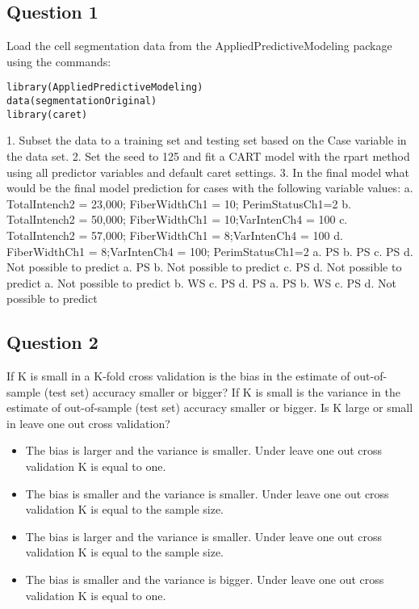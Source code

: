 \subsection*{Question 1}
Load the cell segmentation data from the AppliedPredictiveModeling package using the commands:
\begin{framed}
\begin{verbatim}
library(AppliedPredictiveModeling)
data(segmentationOriginal)
library(caret)
\end{verbatim}
\end{framed}
1. Subset the data to a training set and testing set based on the Case variable in the data set. 
2. Set the seed to 125 and fit a CART model with the rpart method using all predictor variables and default caret settings. 
3. In the final model what would be the final model prediction for cases with the following variable values:
a. TotalIntench2 = 23,000; FiberWidthCh1 = 10; PerimStatusCh1=2 
b. TotalIntench2 = 50,000; FiberWidthCh1 = 10;VarIntenCh4 = 100 
c. TotalIntench2 = 57,000; FiberWidthCh1 = 8;VarIntenCh4 = 100 
d. FiberWidthCh1 = 8;VarIntenCh4 = 100; PerimStatusCh1=2 
a. PS 
b. PS 
c. PS
d. Not possible to predict 
 a. PS 
b. Not possible to predict 
c. PS
d. Not possible to predict 
 a. Not possible to predict 
b. WS 
c. PS
d. PS 
 a. PS 
b. WS 
c. PS
d. Not possible to predict 
\subsection*{Question 2}
If K is small in a K-fold cross validation is the bias in the estimate of out-of-sample (test set) accuracy smaller or bigger? If K is small is the variance in the estimate of out-of-sample (test set) accuracy smaller or bigger. Is K large or small in leave one out cross validation?

\begin{itemize}
\item The bias is larger and the variance is smaller. Under leave one out cross validation K is equal to one.
\item The bias is smaller and the variance is smaller. Under leave one out cross validation K is equal to the sample size.
\item The bias is larger and the variance is smaller. Under leave one out cross validation K is equal to the sample size.
\item The bias is smaller and the variance is bigger. Under leave one out cross validation K is equal to one.
\end{itemize}
